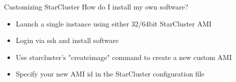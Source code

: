 \begin{frame}{Customizing StarCluster}
How do I install my own software?
\begin{itemize}
\item Launch a single instance using either 32/64bit StarCluster AMI
\item Login via ssh and install software
\item Use starcluster's "createimage" command to create a new custom AMI
\item Specify your new AMI id in the StarCluster configuration file
\end{itemize}
\end{frame}
